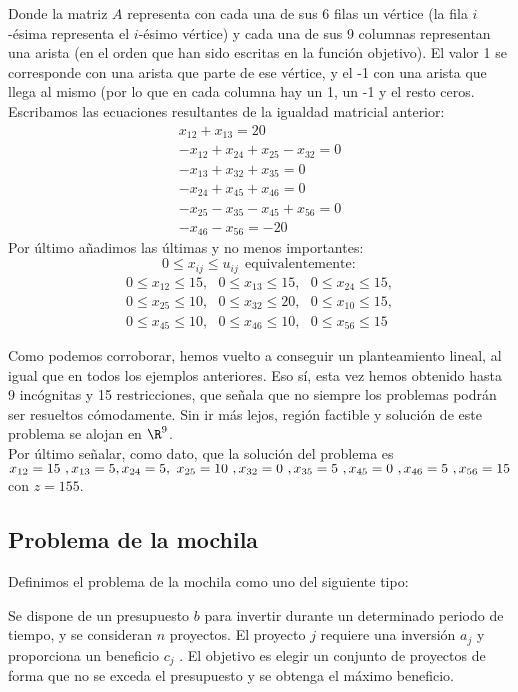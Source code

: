 Donde la matriz $A$ representa con cada una de sus 6 filas un vértice (la fila $i$-ésima representa el $i$-ésimo vértice) y cada una de sus 9 columnas representan una arista (en el orden que han sido escritas en la función objetivo). El valor 1 se corresponde con una arista que parte de ese vértice, y el -1 con una arista que llega al mismo (por lo que en cada columna hay un 1, un -1 y el resto ceros. Escribamos las ecuaciones resultantes de la igualdad matricial anterior:
\begin{align*} x_{12}+x_{13}=20\\-x_{12}+x_{24}+x_{25}-x_{32}=0\\-x_{13}+x_{32}+x_{35}=0\\-x_{24}+x_{45}+x_{46}=0\\-x_{25}-x_{35}-x_{45}+x_{56}=0\\-x_{46}-x_{56}=-20\end{align*}
Por último añadimos las últimas y no menos importantes:
\[0\leq x_{ij}\leq u_{ij}\ \ \mathrm{equivalentemente:}\]
\begin{align*} 0\leq x_{12}\leq 15,\ \ \ 0\leq x_{13}\leq 15,\ \ \ 0\leq x_{24}\leq 15,\\
0\leq x_{25}\leq 10,\ \ \ 0\leq x_{32}\leq 20,\ \ \ 0\leq x_{10}\leq 15,\\
0\leq x_{45}\leq 10,\ \ \ 0\leq x_{46}\leq 10,\ \ \ 0\leq x_{56}\leq 15
\end{align*}

Como podemos corroborar, hemos vuelto a conseguir un planteamiento lineal, al igual que en todos los ejemplos anteriores. Eso sí, esta vez hemos obtenido hasta 9 incógnitas y 15 restricciones, que señala que no siempre los problemas podrán ser resueltos cómodamente. Sin ir más lejos, región factible y solución de este problema se alojan en $\R^9$.\\

Por último señalar, como dato, que la solución del problema es $x_{12}=15\ ,x_{13}=5,\\x_{24}=5,\ x_{25}=10\ ,x_{32}=0\ ,x_{35}=5\ ,x_{45}=0\ ,x_{46}=5\ ,x_{56}=15$ con $z=155$.

\subsection{Problema de la mochila}

\begin{defi} Definimos el problema de la mochila como uno del siguiente tipo:

Se dispone de un presupuesto $b$ para invertir durante un determinado periodo de
tiempo, y se consideran $n$ proyectos. El proyecto $j$ requiere una inversión $a_j$ y proporciona
un beneficio $c_j$ . El objetivo es elegir un conjunto de proyectos de forma que no se exceda
el presupuesto y se obtenga el máximo beneficio.
\end{defi}

